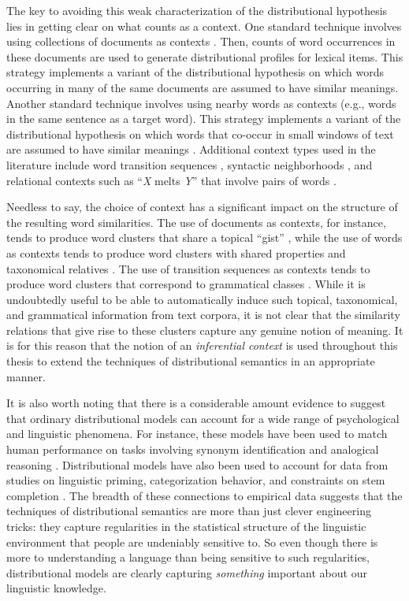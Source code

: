 The key to avoiding this weak characterization of the distributional hypothesis lies in getting clear on what counts as a context. One standard technique involves using collections of documents as contexts \citep[e.g.,][]{LandauerDumais:1997}. Then, counts of word occurrences in these documents are used to generate distributional profiles for lexical items. This strategy implements a variant of the distributional hypothesis on which words occurring in many of the same documents are assumed to have similar meanings. Another standard technique involves using nearby words as contexts (e.g., words in the same sentence as a target word). This strategy implements a variant of the distributional hypothesis on which words that co-occur in small windows of text are assumed to have similar meanings \citep[see e.g.,][]{JonesMewhort:2007,Sahlgren:2008,TurneyPantel:2010}. Additional context types used in the literature include word transition sequences \citep{JonesMewhort:2007}, syntactic neighborhoods \citep{Baroni:2014}, and relational contexts such as ``\textit{X} melts \textit{Y}'' that involve pairs of words \citep[see][pp. 148-9]{TurneyPantel:2010}. 

Needless to say, the choice of context has a significant impact on the structure of the resulting word similarities. The use of documents as contexts, for instance, tends to produce word clusters that share a topical ``gist'' \citep{Baroni:2014}, while the use of words as contexts tends to produce word clusters with shared properties and taxonomical relatives \citep{TurneyPantel:2010}. The use of transition sequences as contexts tends to produce word clusters that correspond to grammatical classes \citep{JonesMewhort:2007}. While it is undoubtedly useful to be able to automatically induce such topical, taxonomical, and grammatical information from text corpora, it is not clear that the similarity relations that give rise to these clusters capture any genuine notion of meaning. It is for this reason that the notion of an \textit{inferential context} is used throughout this thesis to extend the techniques of distributional semantics in an appropriate manner.

It is also worth noting that there is a considerable amount evidence to suggest that ordinary distributional models can account for a wide range of psychological and linguistic phenomena. For instance, these models have been used to match human performance on tasks involving synonym identification \citep{LandauerDumais:1997} and analogical reasoning \citep{Eliasmith:2001}. Distributional models have also been used to account for data from studies on linguistic priming, categorization behavior, and constraints on stem completion \citep{JonesMewhort:2007}. The breadth of these connections to empirical data suggests that the techniques of distributional semantics are more than just clever engineering tricks: they capture regularities in the statistical structure of the linguistic environment that people are undeniably sensitive to. So even though there is more to understanding a language than being sensitive to such regularities, distributional models are clearly capturing \textit{something} important about our linguistic knowledge.

